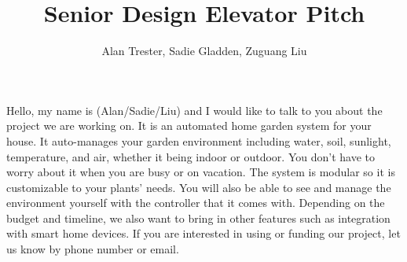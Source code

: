 \documentclass[14pt]{article}
\title{Senior Design Elevator Pitch}
\author{Alan Trester, Sadie Gladden, Zuguang Liu}
\begin{document}
\maketitle

Hello, my name is (Alan/Sadie/Liu) and I would like to talk to you about the project we are working on. It is an automated home garden system for your house. It auto-manages your garden environment including water, soil, sunlight, temperature, and air, whether it being indoor or outdoor. You don't have to worry about it when you are busy or on vacation. The system is modular so it is customizable to your plants' needs. You will also be able to see and manage the environment yourself with the controller that it comes with. Depending on the budget and timeline, we also want to bring in other features such as integration with smart home devices. If you are interested in using or funding our project, let us know by phone number or email. 


\end{document}
